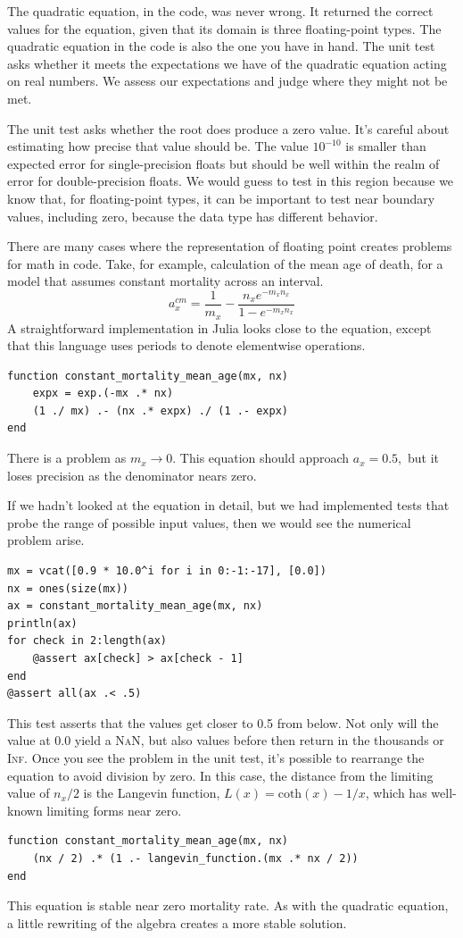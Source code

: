 \documentclass[fleqn,10pt]{olplainarticle}
\newcommand{\nan}{\textsc{NaN}\xspace}
\begin{document}
The quadratic equation, in the code, was never wrong. It returned
the correct values for the equation, given that its domain is
three floating-point types. The quadratic equation in the code
is also the one you have in hand. The unit test asks whether
it meets the expectations we have of the quadratic equation
acting on real numbers. We assess our expectations and judge
where they might not be met.

\noindent{}The unit test asks whether the root does produce a
zero value. It's careful about estimating how precise that value
should be. The value $10^{-10}$ is smaller than expected error
for single-precision floats but should be well within the realm
of error for double-precision floats. We would guess to test
in this region because we know that, for floating-point types,
it can be important to test near boundary values, including
zero, because the data type has different behavior.

There are many cases where the representation of floating point
creates problems for math in code. Take, for example, calculation
of the mean age of death, for a model that assumes constant
mortality across an interval.
\begin{equation}
  a_x^{cm} = \frac{1}{m_x} - \frac{n_x e^{-m_x n_x}}{1-e^{-m_x n_x}}
\end{equation}
A straightforward implementation in Julia looks close to the equation,
except that this language uses periods to denote elementwise
operations.
\begin{lstlisting}
function constant_mortality_mean_age(mx, nx)
    expx = exp.(-mx .* nx)
    (1 ./ mx) .- (nx .* expx) ./ (1 .- expx)
end
\end{lstlisting}
There is a problem as $m_x\rightarrow 0$. This equation should
approach $a_x=0.5,$ but it loses precision as the denominator
nears zero.

If we hadn't looked at the equation in detail, but we had implemented
tests that probe the range of possible input values, then
we would see the numerical problem arise.
\begin{lstlisting}
mx = vcat([0.9 * 10.0^i for i in 0:-1:-17], [0.0])
nx = ones(size(mx))
ax = constant_mortality_mean_age(mx, nx)
println(ax)
for check in 2:length(ax)
    @assert ax[check] > ax[check - 1]
end
@assert all(ax .< .5)
\end{lstlisting}
This test asserts that the values get closer to 0.5 from below.
Not only will the value at 0.0 yield a \nan, but also
values before then return in the thousands or \textsc{Inf}.
Once you see the problem in the unit test, it's possible
to rearrange the equation to avoid
division by zero. In this case, the distance from the limiting
value of $n_x/2$ is the Langevin function, $L(x) = \mbox{coth}(x) - 1/x$,
which has well-known limiting forms near zero.
\begin{lstlisting}
function constant_mortality_mean_age(mx, nx)
    (nx / 2) .* (1 .- langevin_function.(mx .* nx / 2))
end
\end{lstlisting}
This equation is stable near zero mortality rate.
As with the quadratic equation, a little rewriting of the
algebra creates a more stable solution.
\end{document}
